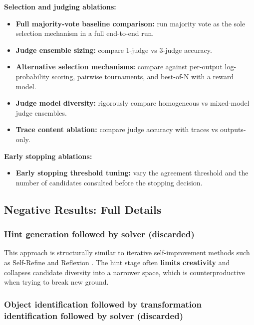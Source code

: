 \documentclass[10pt]{article}
\providecommand{\tightlist}{%
  \setlength{\itemsep}{0pt}\setlength{\parskip}{0pt}}
\begin{document}
\textbf{Selection and judging ablations:}

\begin{itemize}
\tightlist
\item
  \textbf{Full majority-vote baseline comparison:} run majority vote as
  the sole selection mechanism in a full end-to-end run.
\item
  \textbf{Judge ensemble sizing:} compare 1-judge vs 3-judge accuracy.
\item
  \textbf{Alternative selection mechanisms:} compare against per-output
  log-probability scoring, pairwise tournaments, and best-of-N with a
  reward model.
\item
  \textbf{Judge model diversity:} rigorously compare homogeneous vs
  mixed-model judge ensembles.
\item
  \textbf{Trace content ablation:} compare judge accuracy with traces vs
  outputs-only.
\end{itemize}

\textbf{Early stopping ablations:}

\begin{itemize}
\tightlist
\item
  \textbf{Early stopping threshold tuning:} vary the agreement threshold
  and the number of candidates consulted before the stopping decision.
\end{itemize}

\hypertarget{negative-results-full-details}{%
\subsection{Negative Results: Full
Details}\label{negative-results-full-details}}

\hypertarget{hint-generation-followed-by-solver-discarded}{%
\subsubsection{Hint generation followed by solver
(discarded)}\label{hint-generation-followed-by-solver-discarded}}

This approach is structurally similar to iterative self-improvement
methods such as Self-Refine \citep{madaan2023selfrefine} and Reflexion
\citep{shinn2023reflexion}. The hint stage often \textbf{limits
creativity} and collapses candidate diversity into a narrower space,
which is counterproductive when trying to break new ground.

\hypertarget{object-identification-followed-by-transformation-identification-followed-by-solver-discarded}{%
\subsubsection{Object identification followed by transformation
identification followed by solver
(discarded)}\label{object-identification-followed-by-transformation-identification-followed-by-solver-discarded}}
\end{document}
